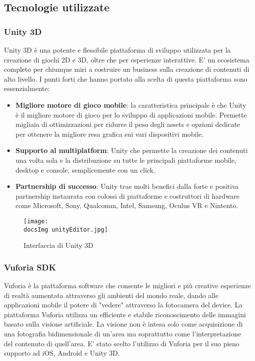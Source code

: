 \subsection{Tecnologie utilizzate}
\subsubsection{Unity 3D}
Unity 3D \`e una potente e flessibile piattaforma di sviluppo utilizzata per la creazione di giochi 2D e 3D, oltre che per esperienze interattive. E' un ecosistema completo per chiunque miri a costruire un business sulla creazione di contenuti di alto livello. I punti forti che hanno portato alla scelta di questa piattaforma sono essenzialmente:
\begin{itemize}
	\item \textbf{Migliore motore di gioco mobile}: la caratteristica principale \`e che Unity \`e il migliore motore di gioco per lo sviluppo di applicazioni mobile. Permette migliaia di ottimizzazioni per ridurre il peso degli assets e opzioni dedicate per ottenere la migliore resa grafica sui vari dispositivi mobile.
	\item \textbf{Supporto al multiplatform}: Unity che permette la creazione dei contenuti una volta sola e la distribuzione su tutte le principali piattaforme mobile, desktop e console, semplicemente con un click.
	\item \textbf{Partnership di successo}: Unity trae molti benefici dalla forte e positiva partnership instaurata con colossi di piattaforme e costruttori di hardware come Microsoft, Sony, Qualcomm, Intel, Samsung, Oculus VR e Nintento.
\end{itemize}  

\begin{figure}[H]
	\centering
	\texttt{[image: \\docsImg unityEditor.jpg]}
	\caption{Interfaccia di Unity 3D}
	\label{fig: Interfaccia di Unity 3D}
\end{figure}

\subsubsection{Vuforia SDK}
Vuforia è la piattaforma software che consente le migliori e più creative esperienze di realtà aumentata attraverso gli ambienti del mondo reale, dando alle applicazioni mobile il potere di "vedere" attraverso la fotocamera del device.
La piattaforma Vuforia utilizza un efficiente e stabile riconoscimento delle immagini basato sulla visione artificiale. La visione non \`e intesa solo come acquisizione di una fotografia bidimensionale di un'area ma soprattutto come l'interpretazione del contenuto di quell'area.
E' stato scelto l'utilizzo di Vuforia per il suo pieno supporto ad iOS, Android e Unity 3D.
\\


